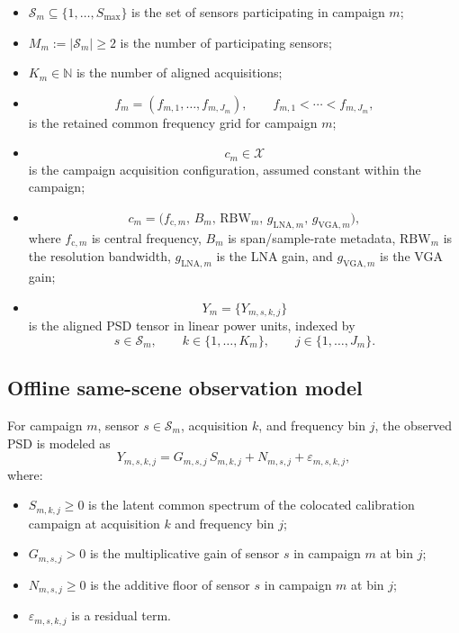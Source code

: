 \begin{itemize}
    \item $\mathcal S_m \subseteq \{1,\dots,S_{\max}\}$ is the set of
    sensors participating in campaign $m$;
    \item $M_m := |\mathcal S_m| \ge 2$ is the number of participating sensors;
    \item $K_m \in \mathbb N$ is the number of aligned acquisitions;
    \item
    \[
    f_m=(f_{m,1},\dots,f_{m,J_m}),
    \qquad
    f_{m,1}<\cdots<f_{m,J_m},
    \]
    is the retained common frequency grid for campaign $m$;
    \item
    \[
    c_m \in \mathcal X
    \]
    is the campaign acquisition configuration, assumed constant within the
    campaign;
    \item
    \[
    c_m
    =
    \bigl(
    f_{{\mathrm c},m},\,
    B_m,\,
    \mathrm{RBW}_m,\,
    g_{{\mathrm{LNA}},m},\,
    g_{{\mathrm{VGA}},m}
    \bigr),
    \]
    where $f_{{\mathrm c},m}$ is central frequency, $B_m$ is span/sample-rate
    metadata, $\mathrm{RBW}_m$ is the resolution bandwidth,
    $g_{{\mathrm{LNA}},m}$ is the LNA gain, and
    $g_{{\mathrm{VGA}},m}$ is the VGA gain;
    \item
    \[
    Y_m=\{Y_{m,s,k,j}\}
    \]
    is the aligned PSD tensor in linear power units, indexed by
    \[
    s\in\mathcal S_m,\qquad
    k\in\{1,\dots,K_m\},\qquad
    j\in\{1,\dots,J_m\}.
    \]
\end{itemize}

\subsection{Offline same-scene observation model}

For campaign $m$, sensor $s\in\mathcal S_m$, acquisition $k$, and frequency
bin $j$, the observed PSD is modeled as
\begin{equation}
Y_{m,s,k,j}
=
G_{m,s,j}\,S_{m,k,j}
+
N_{m,s,j}
+
\varepsilon_{m,s,k,j},
\label{eq:offline-forward}
\end{equation}
where:

\begin{itemize}
    \item $S_{m,k,j}\ge 0$ is the latent common spectrum of the colocated
    calibration campaign at acquisition $k$ and frequency bin $j$;
    \item $G_{m,s,j}>0$ is the multiplicative gain of sensor $s$ in campaign
    $m$ at bin $j$;
    \item $N_{m,s,j}\ge 0$ is the additive floor of sensor $s$ in campaign
    $m$ at bin $j$;
    \item $\varepsilon_{m,s,k,j}$ is a residual term.
\end{itemize}

